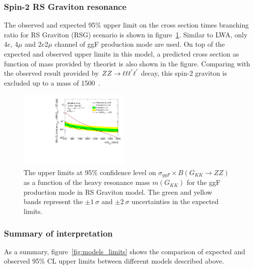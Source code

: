 \subsubsection{Spin-2 RS Graviton resonance}

The observed and expected 95\% upper limit on the cross section times branching ratio for RS Graviton (RSG) scenario is shown in figure~\ref{fig:RSGlimits_ggF_201518}.
Similar to LWA, only 4$e$, 4$\mu$ and 2$e$2$\mu$ channel of ggF production mode are used.
On top of the expected and observed upper limits in this model, a predicted cross section as function of mass provided by theorist is also shown in the figure.
Comparing with the observed result provided by $ZZ \rightarrow \ell\ell\ell^{'}\ell^{'}$ decay, this spin-2 graviton is excluded up to a mass of 1500~\gev.

\begin{figure}[h]
    \begin{center}
    \includegraphics[width=0.48\textwidth]{figures/HMHZZ/results/Limits_RSG.pdf}
    \end{center}
    \caption{The upper limits at 95\% confidence level on $\sigma_{ggF} \times B(G_{KK}\rightarrow ZZ)$
    as a function of the heavy resonance mass $m(G_{KK})$ for the ggF production mode in RS Graviton model.
    The green and yellow bands represent the $\pm 1~\sigma$ and $\pm 2~\sigma$ uncertainties in the expected limits.
  }
    \label{fig:RSGlimits_ggF_201518}
\end{figure}

\subsubsection{Summary of interpretation}

As a summary, figure~\ref{fig:models_limits} shows the comparison of expected and observed 95\% CL upper limits between different models described above.

